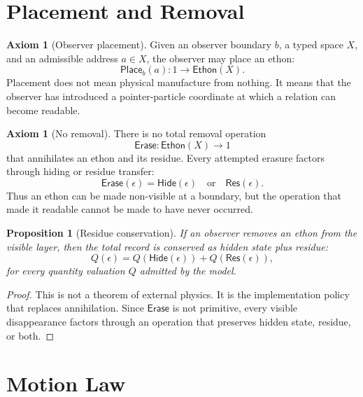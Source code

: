 \documentclass[11pt]{article}
\theoremstyle{definition}
\newtheorem{axiom}[definition]{Axiom}
\theoremstyle{plain}
\newtheorem{proposition}[definition]{Proposition}
\newcommand{\Eth}{\mathsf{Ethon}}
\newcommand{\Place}{\mathsf{Place}}
\newcommand{\Erase}{\mathsf{Erase}}
\newcommand{\Hide}{\mathsf{Hide}}
\newcommand{\Res}{\mathsf{Res}}
\begin{document}
\section{Placement and Removal}

\begin{axiom}[Observer placement]
Given an observer boundary \(b\), a typed space \(X\), and an admissible
address \(a\in X\), the observer may place an ethon:
\[
  \Place_b(a):1\to\Eth(X).
\]
Placement does not mean physical manufacture from nothing.  It means that
the observer has introduced a pointer-particle coordinate at which a
relation can become readable.
\end{axiom}

\begin{axiom}[No removal]
There is no total removal operation
\[
  \Erase:\Eth(X)\to 1
\]
that annihilates an ethon and its residue.  Every attempted erasure
factors through hiding or residue transfer:
\[
  \Erase(\epsilon)
  =
  \Hide(\epsilon)
  \quad\text{or}\quad
  \Res(\epsilon).
\]
Thus an ethon can be made non-visible at a boundary, but the operation
that made it readable cannot be made to have never occurred.
\end{axiom}

\begin{proposition}[Residue conservation]
If an observer removes an ethon from the visible layer, then the total
record is conserved as hidden state plus residue:
\[
  Q(\epsilon)
  =
  Q(\Hide(\epsilon))+Q(\Res(\epsilon)),
\]
for every quantity valuation \(Q\) admitted by the model.
\end{proposition}

\begin{proof}
This is not a theorem of external physics.  It is the implementation
policy that replaces annihilation.  Since \(\Erase\) is not primitive,
every visible disappearance factors through an operation that preserves
hidden state, residue, or both.
\end{proof}

\section{Motion Law}
\end{document}
